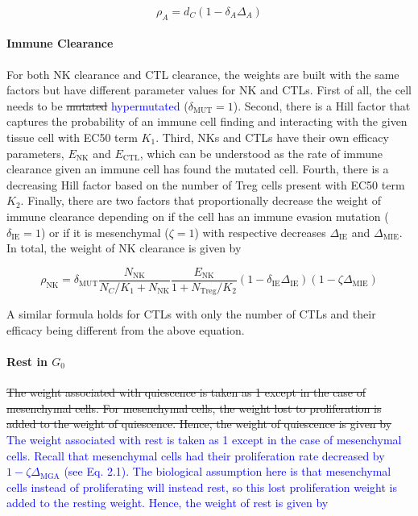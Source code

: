 \documentclass[11pt]{article}
\newcommand{\tcb} { \textcolor{blue} }
\begin{document}
\begin{equation}\tag{2.2}
\rho_A = d_C(1-\delta_{A}\Delta_A)
\end{equation}

\paragraph{Immune Clearance}
For both NK clearance and CTL clearance, the weights are built with the same factors but have different parameter values for NK and CTLs.
First of all, the cell needs to be \sout{mutated} \tcb{hypermutated} ($\delta_{\text{MUT}}=1$).
Second, there is a Hill factor that captures the probability of an immune cell finding and interacting with the given tissue cell with EC50 term $K_1$.
Third, NKs and CTLs have their own efficacy parameters, $E_{\text{NK}}$ and $E_{\text{CTL}}$, which can be understood as the rate of immune clearance given an immune cell has found the mutated cell.
Fourth, there is a decreasing Hill factor based on the number of Treg cells present with EC50 term $K_2$.
Finally, there are two factors that proportionally decrease the weight of immune clearance depending on if the cell has an immune evasion mutation ($\delta_{\text{IE}}=1$) or if it is mesenchymal ($\zeta=1$) with respective decreases $\Delta_{\text{IE}}$ and $\Delta_{\text{MIE}}$.
In total, the weight of NK clearance is given by

\begin{equation}\tag{2.3}
\rho_{\text{NK}} =\delta_{\text{MUT}} \frac{N_{\text{NK}}}{N_C/K_{1}+N_{\text{NK}}}  \frac{E_{\text{NK}}}{1+N_{\text{Treg}}/K_2} (1-\delta_{\text{IE}}\Delta_{\text{IE}})(1-\zeta \Delta_{\text{MIE}})
\end{equation}

A similar formula holds for CTLs with only the number of CTLs and their efficacy being different from the above equation.


\paragraph{Rest in $G_0$} 
\sout{The weight associated with quiescence is taken as 1 except in the case of mesenchymal cells.
For mesenchymal cells, the weight lost to proliferation is added to the weight of quiescence.
Hence, the weight of quiescence is given by}
\tcb{The weight associated with rest is taken as 1 except in the case of mesenchymal cells.
Recall that mesenchymal cells had their proliferation rate decreased by $1-\zeta\Delta_{\text{MGA}}$ (see Eq. 2.1).
The biological assumption here is that mesenchymal cells instead of proliferating will instead rest, so this lost proliferation weight is added to the resting weight.
Hence, the weight of rest is given by}
\end{document}
